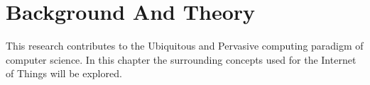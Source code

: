 \chapter{Background And Theory}

This research contributes to the Ubiquitous and Pervasive computing paradigm of computer science. In this chapter the surrounding concepts used for the Internet of Things will be explored. 








